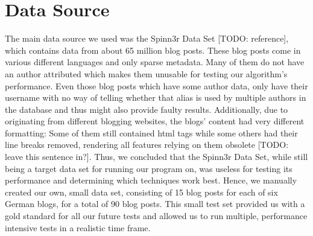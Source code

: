 \section{Data Source}
\label{sec:data_source}

The main data source we used was the Spinn3r Data Set [TODO: reference], which contains data from about 65 million blog posts. These blog posts come in various different languages and only sparse metadata. Many of them do not have an author attributed which makes them unusable for testing our algorithm’s performance. Even those blog posts which have some author data, only have their username with no way of telling whether that alias is used by multiple authors in the database and thus might also provide faulty results. Additionally, due to originating from different blogging websites, the blogs’ content had very different formatting: Some of them still contained html tags while some others had their line breaks removed, rendering all features relying on them obsolete [TODO: leave this sentence in?]. Thus, we concluded that the Spinn3r Data Set, while still being a target data set for running our program on, was useless for testing its performance and determining which techniques work best.
Hence, we manually created our own, small data set, consisting of 15 blog posts for each of six German blogs, for a total of 90 blog posts. This small test set provided us with a gold standard for all our future tests and allowed us to run multiple, performance intensive tests in a realistic time frame.